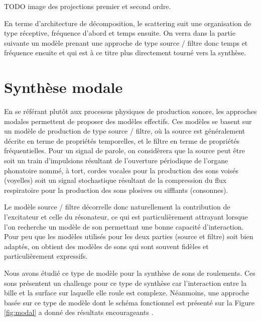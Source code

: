 TODO image des projections premier et second ordre.

En terme d'architecture de décomposition, le scattering suit une organisation de type réceptive, fréquence d'abord et temps ensuite. On verra dans la partie suivante un modèle prenant une approche de type source / filtre donc temps et fréquence ensuite et qui est à ce titre plus directement tourné vers la synthèse.

\section{ \nmu Synthèse modale}

En se référant plutôt aux processus physiques de production sonore, les approches modales permettent de proposer des modèles effectifs. Ces modèles se basent sur un modèle de production de type source / filtre, où la source est généralement décrite en terme de propriétés temporelles, et le filtre en terme de propriétés fréquentielles. Pour un signal de parole, on considèrera que la source peut être soit un train d'impulsions résultant de l'ouverture périodique de l'organe phonatoire nommé, à tort,  cordes vocales pour la production des sons voisés (voyelles) soit un signal stochastique résultant de la compression du flux respiratoire pour la production des sons plosives ou sifflants (consonnes).

Le modèle source / filtre décorrelle donc naturellement la contribution de l'excitateur et celle du résonateur, ce qui est particulièrement attrayant lorsque l'on recherche un modèle de son permettant une bonne capacité d'interaction. Pour peu que les modèles utilisés pour les deux parties (source et filtre) soit bien adaptés, on obtient des modèles de sons qui sont souvent fidèles et particulièrement expressifs\cite{aramaki2006analysis}.

Nous avons étudié ce type de modèle pour la synthèse de sons de roulements. Ces sons présentent un challenge pour ce type de synthèse car l'interaction entre la bille et la surface sur laquelle elle roule est complexe. Néanmoins, une approche basée sur ce type de modèle\cite{LagrangeTasslp10} dont le schéma fonctionnel est présenté sur la Figure \ref{fig:modal}  a donné des résultats encourageants
\cite{Murphy11a}.

\begin{marginfigure}
  \scalebox{.6}{
  }
  \label{fig:modal}
\caption{}
\end{marginfigure}

